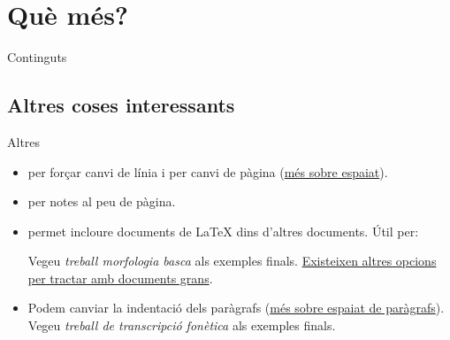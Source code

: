\section{Què més?}
\begin{frame}{Continguts}
\begin{multicols}{2}
\tableofcontents[currentsection]
\end{multicols}
\end{frame}

\subsection{Altres coses interessants}
\begin{frame}[fragile]{Altres}
\begin{itemize}
    \item \cmdbs{\textbackslash} per forçar canvi de línia i  per canvi de pàgina (\href{https://www.overleaf.com/learn/latex/Line_breaks_and_blank_spaces#Line_breaks}{més sobre espaiat}).
\item {} per notes al peu de pàgina.
\item {} permet incloure documents de \LaTeX{} dins d'altres documents.
    Útil per:
        \footnotesize{Vegeu \textit{treball morfologia basca} als exemples finals.}
        \href{https://www.overleaf.com/learn/latex/Management_in_a_large_project}{Existeixen altres opcions per tractar amb documents grans}.
    \item Podem canviar la indentació dels paràgrafs (\href{https://www.overleaf.com/learn/latex/Articles/How_to_change_paragraph_spacing_in_LaTeX}{més sobre espaiat de paràgrafs}). \\
    \footnotesize{Vegeu \textit{treball de transcripció fonètica} als exemples finals.}
\begin{exampletiny}
\setlength{\parindent}{0pt}
\setlength{\parskip}{\baselineskip}
\end{exampletiny}
\end{itemize}
\end{frame}

